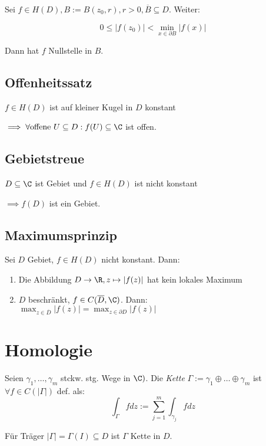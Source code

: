 Sei \(f \in H(D), B := B(z_0,r), r > 0, \overline B \subseteq D\). Weiter:

\vspace*{-3mm}
\[ 0 \leq |f(z_0)| < \min_{x \in \partial B} |f(x)| \]

Dann hat \(f\) Nullstelle in \(B\).

\subsection*{Offenheitssatz}

\(f \in H(D)\) ist auf kleiner Kugel in \(D\) konstant

\(\implies \forall \text{offene } U \subseteq D : f(U) \subseteq \C\) ist offen.

\subsection*{Gebietstreue}

\(D \subseteq \C\) ist Gebiet und \(f \in H(D)\) ist nicht konstant

\(\implies f(D)\) ist ein Gebiet.

\subsection*{Maximumsprinzip}

Sei \(D\) Gebiet, \(f \in H(D)\) nicht konstant. Dann:

\begin{enumerate}[label=(\alph*)]
	\item Die Abbildung \(D \to \R, z \mapsto |f(z)|\) hat kein lokales Maximum
	\item \(D\) beschränkt, \(f \in C(\overline D,\C)\). Dann: \\ \(\max_{z \in \overline D} |f(z)| = \max_{z \in \partial D} |f(z)|\)
\end{enumerate}

\section*{Homologie}

Seien \(\gamma_1,\dots,\gamma_m\) stckw. stg. Wege in \(\C)\). Die \emph{Kette} \(\Gamma := \gamma_1 \oplus \dots \oplus \gamma_m\) ist \(\forall f \in C(|\Gamma|)\) def. als: \[\int_\Gamma f dz := \sum_{j=1}^m \int_{\gamma_j} f dz\]

Für Träger \(|\Gamma| = \Gamma(I) \subseteq D\) ist \(\Gamma\) Kette in \(D\).

